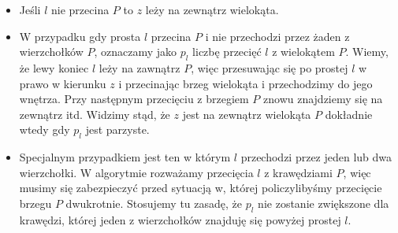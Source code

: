 \begin{itemize}
\item Jeśli $l$ nie przecina $P$ to $z$ leży na zewnątrz wielokąta.
  \begin{figure}[htp]
    \centering
    \caption{}
  \end{figure}

\item W przypadku gdy prosta $l$ przecina $P$ i nie przechodzi przez
  żaden z wierzchołków $P$, oznaczamy jako $p_l$ liczbę przecięć $l$ z
  wielokątem $P$. Wiemy, że lewy koniec $l$ leży na zawnątrz $P$, więc
  przesuwając się po prostej $l$ w prawo w kierunku $z$ i przecinając
  brzeg wielokąta i przechodzimy do jego wnętrza. Przy następnym
  przecięciu z brzegiem $P$ znowu znajdziemy się na zewnątrz
  itd. Widzimy stąd, że $z$ jest na zewnątrz wielokąta $P$ dokładnie
  wtedy gdy $p_l$ jest parzyste.

  \begin{figure}[htp]
    \centering
    \caption{}
  \end{figure}

\item Specjalnym przypadkiem jest ten w którym $l$ przechodzi przez
  jeden lub dwa wierzchołki. W algorytmie rozważamy przecięcia $l$ z
  krawędziami $P$, więc musimy się zabezpieczyć przed sytuacją w,
  której policzylibyśmy przecięcie brzegu $P$ dwukrotnie. Stosujemy tu
  zasadę, że $p_l$ nie zostanie zwiększone dla krawędzi, której jeden
  z wierzchołków znajduję się powyżej prostej $l$.


\end{itemize}
